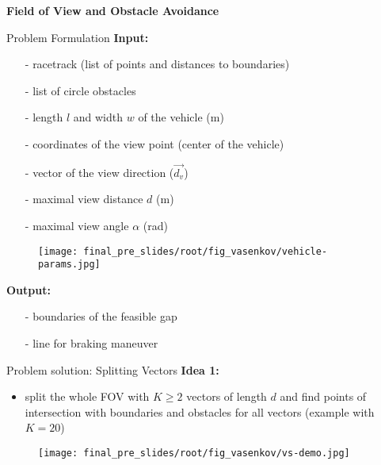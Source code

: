 \begin{frame}{}
    \vspace{2cm}
      \centering
      {\LARGE \textbf{Field of View and Obstacle Avoidance}\par}
      \vspace{2cm}
    \end{frame}
    
    
    \begin{frame}{Problem Formulation}
    \textbf{\large Input:}
    
    \begin{itemize}
      \item[-] racetrack (list of points and distances to boundaries)
      \item[-] list of circle obstacles
      \item[-] length $l$ and width $w$ of the vehicle (m)
      \item[-] coordinates of the view point (center of the vehicle)
      \item[-] vector of the view direction ($\vec{d_v}$)
      \item[-] maximal view distance $d$ (m)
      \item[-] maximal view angle $\alpha$ (rad)
    \end{itemize}
    \vspace{0.5cm}
    
    \begin{wrapfigure}{r}{0.42\textwidth}
      \vspace{-2.9cm}
      \begin{center}
        \texttt{[image: final\_pre\_slides/root/fig\_vasenkov/vehicle-params.jpg]}
      \end{center}
    \end{wrapfigure}
    
    \textbf{\large Output:}
    \begin{itemize}
      \item[-] boundaries of the feasible gap
      \item[-] line for braking maneuver
    \end{itemize}
    
    \end{frame}
    
    \begin{frame}{Problem solution: Splitting Vectors}
    \textbf{\large Idea 1:}
    \begin{itemize}
      \item split the whole FOV with $K \geq 2$ vectors of length $d$ and find  points of intersection with boundaries and obstacles for all vectors (example with $K = 20$)
    \end{itemize}
    \begin{figure}
        \texttt{[image: final\_pre\_slides/root/fig\_vasenkov/vs-demo.jpg]}
        \label{fig:enter-label}
    \end{figure}
    \end{frame}
    
